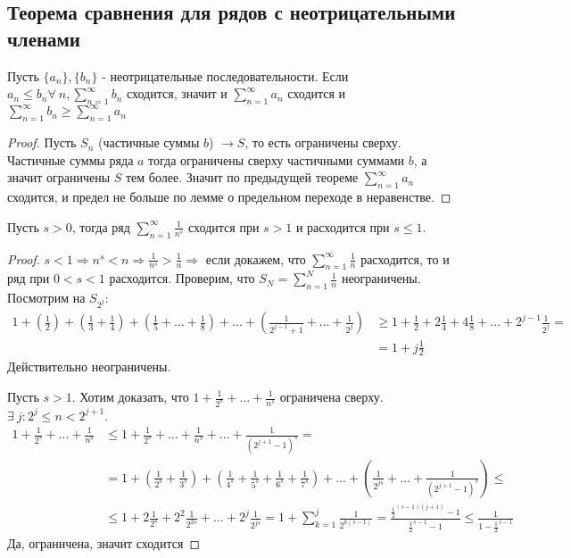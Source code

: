 \documentclass[11pt]{book}
\newcommand{\slim}{\sum\limits}
\renewcommand{\le}{\leqslant}
\renewcommand{\ge}{\geqslant}
\theoremstyle{definition}
\theoremstyle{plain}
\theoremstyle{plain}
\theoremstyle{definition}
\theoremstyle{remark}
\begin{document}
\subsection{Теорема сравнения для рядов с неотрицательными членами}
\begin{thm}
Пусть $\{a_n\}, \{b_n\}$ - неотрицательные последовательности. Если $a_n \le b_n \forall ~n, \slim_{n = 1}^\infty{b_n}$ сходится, значит и $\slim_{n = 1}^\infty{a_n}$ сходится и $\slim_{n = 1}^\infty{b_n} \ge \slim_{n = 1}^\infty{a_n}$
\end{thm}
\begin{proof}
Пусть $S_n$ (частичные суммы $b$) $\to S$, то есть ограничены сверху. Частичные суммы ряда $a$ тогда ограничены сверху частичными суммами $b$, а значит ограничены $S$ тем более. Значит по предыдущей теореме $\slim_{n = 1}^\infty{a_n}$ сходится, и предел не больше по лемме о предельном переходе в неравенстве.
\end{proof}

\begin{thm}
    Пусть $s>0$, тогда ряд $\slim_{n=1}^\infty \frac{1}{n^s}$ сходится при $s > 1$ и расходится при $s \le 1$.
\end{thm}
\begin{proof}
$s < 1 \Rightarrow n^s < n \Rightarrow \frac{1}{n^s} > \frac{1}{n} \Rightarrow$ если докажем, что $\slim_{n = 1}^\infty{\frac{1}{n}}$ расходится, то и ряд при $0 < s < 1$ расходится. Проверим, что $S_N = \slim_{n = 1}^N{\frac{1}{n}}$ неограничены. Посмотрим на $S_{2^j}$:
$$
\begin{aligned}
    1 + \left(\frac{1}{2}\right) + \left(\frac{1}{3} + \frac{1}{4}\right) + \left(\frac{1}{5} + \ldots + \frac{1}{8}\right) + \ldots + \left(\frac{1}{2^{j - 1} + 1} + \ldots + \frac{1}{2^j}\right) &\ge 1 + \frac{1}{2} + 2\frac{1}{4} + 4\frac{1}{8} + \dots + 2^{j - 1}\frac{1}{2^j} = \\
																								     & = 1 + j\frac{1}{2}
 \end{aligned}
 $$
Действительно неограничены. 

Пусть $s > 1$. Хотим доказать, что $1 + \frac{1}{2^s} + \dots + \frac{1}{n^s}$ ограничена сверху. $\exists ~j: 2^j \le n < 2^{j + 1}$.
$$
\begin{aligned}
    1 + \frac{1}{2^s} + \ldots + \frac{1}{n^s} &\le 1 + \frac{1}{2^s} + \ldots + \frac{1}{n^s} + \ldots + \frac{1}{(2^{j + 1} - 1)^s} = \\
					       &= 1 + \left(\frac{1}{2^s} + \frac{1}{3^s}\right) + \left(\frac{1}{4^s} + \frac{1}{5^s} + \frac{1}{6^s} + \frac{1}{7^s}\right) + \ldots + \left(\frac{1}{2^{js}} + \ldots + \frac{1}{(2^{j + 1} - 1)^s}\right) \le \\
					       &\le 1 + 2\frac{1}{2^s} + 2^2\frac{1}{2^{2s}} + \dots + 2^j\frac{1}{2^{js}} = 1 + \slim_{k = 1}^j{\frac{1}{2^{k(s - 1)}}} = \frac{\frac{1}{2}^{(s - 1)(j + 1)} - 1}{\frac{1}{2}^{s - 1} - 1} \le \frac{1}{1 - \frac{1}{2}^{s - 1}}
\end{aligned}
$$
Да, ограничена, значит сходится
\end{proof}
\end{document}
